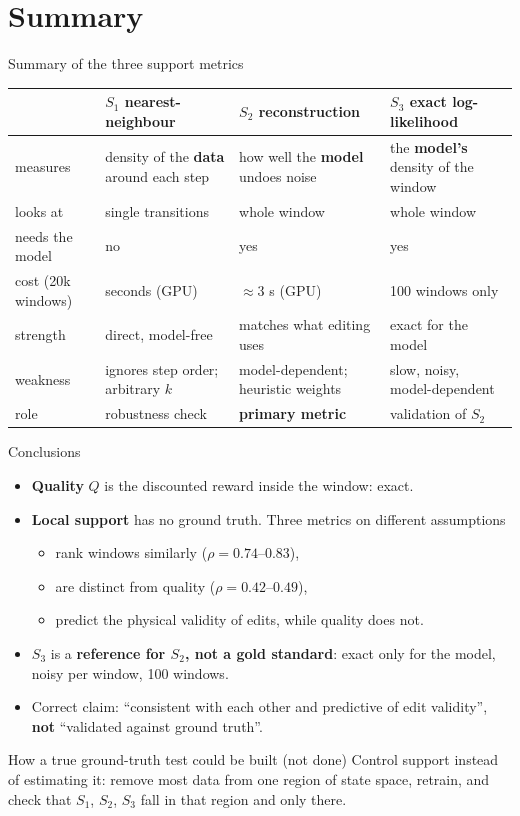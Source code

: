 \documentclass[aspectratio=169,11pt]{beamer}
\begin{document}
\section{Summary}
\begin{frame}{Summary of the three support metrics}
\small
\begin{tabularx}{\linewidth}{@{}lYYY@{}}
\toprule
 & $S_1$ nearest-neighbour & $S_2$ reconstruction & $S_3$ exact log-likelihood\\
\midrule
measures & density of the \textbf{data} around each step & how well the \textbf{model} undoes noise & the \textbf{model's} density of the window\\
looks at & single transitions & whole window & whole window\\
needs the model & no & yes & yes\\
cost (20k windows) & seconds (GPU) & $\approx3$ s (GPU) & 100 windows only\\
strength & direct, model-free & matches what editing uses & exact for the model\\
weakness & ignores step order; arbitrary $k$ & model-dependent; heuristic weights & slow, noisy, model-dependent\\
role & robustness check & \textbf{primary metric} & validation of $S_2$\\
\bottomrule
\end{tabularx}
\end{frame}

\begin{frame}{Conclusions}
\begin{itemize}
\item \textbf{Quality} $Q$ is the discounted reward inside the window: exact.
\item \textbf{Local support} has no ground truth. Three metrics on different assumptions
\begin{itemize}
\item rank windows similarly ($\rho=0.74$--$0.83$),
\item are distinct from quality ($\rho=0.42$--$0.49$),
\item predict the physical validity of edits, while quality does not.
\end{itemize}
\item $S_3$ is a \textbf{reference for $S_2$, not a gold standard}: exact only for the model, noisy per window, 100 windows.
\item Correct claim: ``consistent with each other and predictive of edit validity'', \textbf{not} ``validated against ground truth''.
\end{itemize}
\vspace{0.5em}
\begin{block}{How a true ground-truth test could be built (not done)}
Control support instead of estimating it: remove most data from one region of state space, retrain, and check that $S_1$, $S_2$, $S_3$ fall in that region and only there.
\end{block}
\end{frame}
\end{document}
